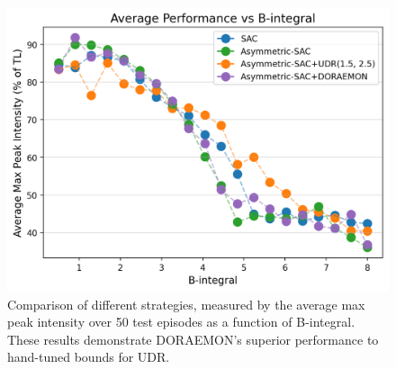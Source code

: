 
\begin{figure}
    \centering
    \includegraphics[width=0.7\linewidth]{images/max_intensity_vs_b_integral.png}
    \caption{Comparison of different strategies, measured by the average max peak intensity over 50 test episodes as a function of B-integral. These results demonstrate DORAEMON's superior performance to hand-tuned bounds for UDR.}
    \label{fig:max_intensity_vs_b_integral}
\end{figure}

